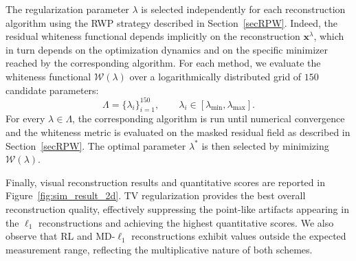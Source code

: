 \documentclass[letterpaper]{article}
\begin{document}
The regularization parameter $\lambda$ is selected independently for each reconstruction algorithm using the RWP strategy described in Section~\ref{secRPW}. Indeed, the residual whiteness functional depends implicitly on the reconstruction $\mathbf{x}^\lambda$, which in turn depends on the optimization dynamics and on the specific minimizer reached by the corresponding algorithm.
 For each method, we evaluate the whiteness functional $\mathcal W(\lambda)$ over a logarithmically distributed grid of $150$ candidate parameters:
\begin{equation}
    \Lambda
    =
    \{\lambda_i\}_{i=1}^{150},
    \qquad
    \lambda_i\in[\lambda_{\text{min}},\lambda_{\text{max}}].
\end{equation}
For every $\lambda\in\Lambda$, the corresponding algorithm is run until numerical convergence and the whiteness metric is evaluated on the masked residual field as described in Section~\ref{secRPW}. The optimal parameter $\lambda^*$ is then selected by minimizing $\mathcal W(\lambda)$.





Finally, visual reconstruction results and quantitative scores are reported in Figure~\ref{fig:sim_result_2d}. TV regularization provides the best overall reconstruction quality, effectively suppressing the point-like artifacts appearing in the $\ell_1$ reconstructions and achieving the highest quantitative scores. We also observe that RL and MD-$\ell_1$ reconstructions exhibit values outside the expected measurement range, reflecting the multiplicative nature of both schemes.
\end{document}
